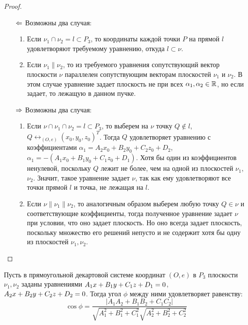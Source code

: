 \begin{proof}~
	\begin{itemize}
		\item[$\Leftarrow$] Возможны два случая:
		\begin{enumerate}
			\item Если $\nu_1 \cap \nu_2 = l \subset P_3$, то координаты каждой точки $P$ на прямой $l$ удовлетворяют требуемому уравнению, откуда $l \subset \nu$.
			\item Если $\nu_1 \parallel \nu_2$, то из требуемого уравнения сопутствующий вектор плоскости $\nu$ параллелен сопутствующим векторам плоскостей $\nu_1$ и $\nu_2$. В этом случае уравнение задает плоскость не при всех $\alpha_1, \alpha_2 \in \mathbb{R}$, но если задает, то лежащую в данном пучке.
		\end{enumerate}
		
		\item[$\Rightarrow$] Возможны два случая:
		\begin{enumerate}
			\item Если $\nu \cap \nu_1 \cap \nu_2 = l \subset P_3$, то выберем на $\nu$ точку $Q \not\in l$, $Q \leftrightarrow_{(O, e)} (x_0, y_0, z_0)^T$. Тогда $Q$ удовлетворяет уравнению с коэффициентами $\alpha_1 = A_2x_0+B_2y_0+C_2z_0 + D_2$, $\alpha_1 = -(A_1x_0+B_1y_0+C_1z_0 + D_1)$. \pagebreak Хотя бы один из коэффициентов ненулевой, поскольку $Q$ лежит не более, чем на одной из плоскостей $\nu_1$, $\nu_2$. Значит, такое уравнение задает $\nu$, так как ему удовлетворяют все точки прямой $l$ и точка, не лежащая на $l$.
			
			\item Если $\nu \parallel \nu_1 \parallel \nu_2$, то аналогичным образом выберем любую точку $Q \in \nu$ и соответствующие коэффициенты, тогда полученное уравнение задает $\nu$ при условии, что оно задает плоскость. Но оно всегда задает плоскость, поскольку множество его решений непусто и не содержит хотя бы одну из плоскостей $\nu_1, \nu_2$.\qedhere
		\end{enumerate}
	\end{itemize}
\end{proof}

\begin{proposition}
	Пусть в прямоугольной декартовой системе координат $(O, e)$ в $P_3$ плоскости $\nu_1, \nu_2$ заданы уравнениями $A_1x\hm{+}B_1y+C_1z+D_1=0$, $A_2x\hm{+}B_2y\hm{+}C_2z+D_2=0$. Тогда угол $\phi$ между ними удовлетворяет равенству:
	\[\cos{\phi} = \frac{|A_1A_2+B_1B_2+C_1C_2|}{\sqrt{A_1^2+B_1^2+C_1^2}\sqrt{A_2^2+B_2^2+C_2^2}}\]
\end{proposition}

